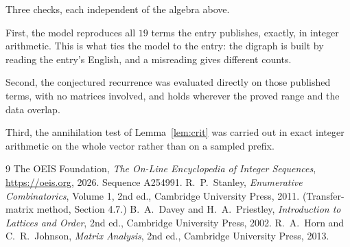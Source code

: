 \documentclass[11pt,a4paper]{article}
\theoremstyle{plain}
\theoremstyle{definition}
\begin{document}
Three checks, each independent of the algebra above.

First, the model reproduces all $19$ terms the entry publishes, exactly, in integer
arithmetic. This is what ties the model to the entry: the digraph is built by reading the
entry's English, and a misreading gives different counts.

Second, the conjectured recurrence was evaluated directly on those published terms, with no
matrices involved, and holds wherever the proved range and the data overlap.

Third, the annihilation test of Lemma~\ref{lem:crit} was carried out in exact integer
arithmetic on the whole vector rather than on a sampled prefix.

\begin{thebibliography}{9}
 The OEIS Foundation, \emph{The On-Line Encyclopedia of Integer
Sequences}, \url{https://oeis.org}, 2026. Sequence A254991.
 R.~P.~Stanley, \emph{Enumerative Combinatorics}, Volume 1, 2nd ed.,
Cambridge University Press, 2011. (Transfer-matrix method, Section 4.7.)
 B.~A.~Davey and H.~A.~Priestley, \emph{Introduction to Lattices and
Order}, 2nd ed., Cambridge University Press, 2002.
 R.~A.~Horn and C.~R.~Johnson, \emph{Matrix Analysis}, 2nd ed., Cambridge
University Press, 2013.
\end{thebibliography}
\end{document}
